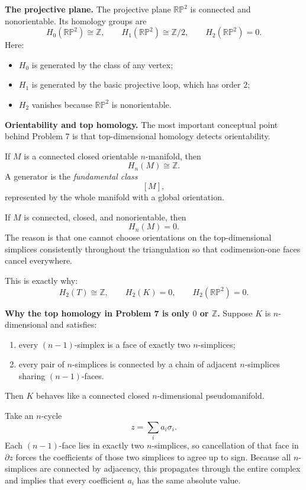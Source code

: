 \documentclass[12pt,a4paper]{article}
\theoremstyle{notespace}
\begin{document}
\medskip

\textbf{The projective plane.}
The projective plane \(\mathbb{RP}^2\) is connected and nonorientable. Its homology groups are
\[
H_0(\mathbb{RP}^2)\cong \mathbb Z,
\qquad
H_1(\mathbb{RP}^2)\cong \mathbb Z/2,
\qquad
H_2(\mathbb{RP}^2)=0.
\]
Here:

\begin{itemize}
	\item \(H_0\) is generated by the class of any vertex;
	\item \(H_1\) is generated by the basic projective loop, which has order \(2\);
	\item \(H_2\) vanishes because \(\mathbb{RP}^2\) is nonorientable.
\end{itemize}

\bigskip

\textbf{Orientability and top homology.}
The most important conceptual point behind Problem 7 is that top-dimensional homology detects orientability.

If \(M\) is a connected closed orientable \(n\)-manifold, then
\[
H_n(M)\cong \mathbb Z.
\]
A generator is the \emph{fundamental class}
\[
[M],
\]
represented by the whole manifold with a global orientation.

If \(M\) is connected, closed, and nonorientable, then
\[
H_n(M)=0.
\]
The reason is that one cannot choose orientations on the top-dimensional simplices consistently throughout the triangulation so that codimension-one faces cancel everywhere.

This is exactly why:
\[
H_2(T)\cong \mathbb Z,
\qquad
H_2(K)=0,
\qquad
H_2(\mathbb{RP}^2)=0.
\]

\bigskip

\textbf{Why the top homology in Problem 7 is only \(0\) or \(\mathbb Z\).}
Suppose \(K\) is \(n\)-dimensional and satisfies:

\begin{enumerate}
	\item every \((n-1)\)-simplex is a face of exactly two \(n\)-simplices;
	\item every pair of \(n\)-simplices is connected by a chain of adjacent \(n\)-simplices sharing \((n-1)\)-faces.
\end{enumerate}

Then \(K\) behaves like a connected closed \(n\)-dimensional pseudomanifold.

Take an \(n\)-cycle
\[
z=\sum_i a_i\sigma_i.
\]
Each \((n-1)\)-face lies in exactly two \(n\)-simplices, so cancellation of that face in \(\partial z\) forces the coefficients of those two simplices to agree up to sign. Because all \(n\)-simplices are connected by adjacency, this propagates through the entire complex and implies that every coefficient \(a_i\) has the same absolute value.
\end{document}
